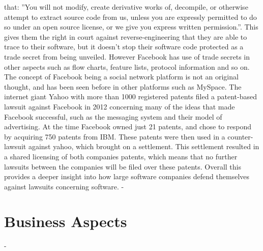 \documentclass[conference]{IEEEtran}
\begin{document}
that: ”You will not modify, create derivative works of, decompile, or otherwise attempt to extract source code from us, unless you are expressly permitted to do so under an open source license, or we give you express written permission.”\cite{facebookrights2013}. This gives them the right in court against reverse-engineering that they are able to trace to their software, but it doesn’t stop their software code protected as a trade secret from being unveiled. However Facebook has use of trade secrets in other aspects such as flow charts, feature lists, protocol information and so on\cite{nguyen2012}. 
The concept of Facebook being a social network platform is not an original thought, and has been seen before in other platforms such as MySpace. The internet giant Yahoo with more than 1000\cite{yahoopatent} registered patents filed a patent-based lawsuit against Facebook in 2012\cite{timothy2012}  concerning many of the ideas that made Facebook successful, such as the messaging system and their model of advertising. At the time Facebook owned just 21 patents, and chose to respond by acquiring 750 patents from IBM\cite{forbes2012}. These patents were then used in a counter-lawsuit against yahoo, which brought on a settlement. This settlement resulted in a shared licensing of both companies patents, which means that no further lawsuits between the companies will be filed over these patents. Overall this provides a deeper insight into how large software companies defend themselves against lawsuits concerning software.
-
\section{Business Aspects}
\label{financial}

-
\end{document}
